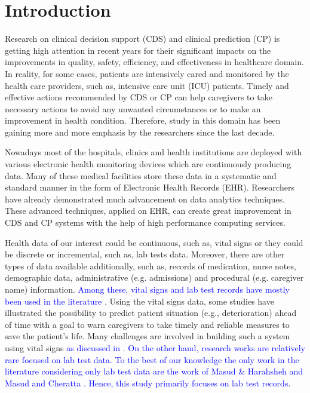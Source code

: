 \section{Introduction}
Research on clinical decision support (CDS) and clinical prediction (CP) is getting high attention in recent years for their significant impacts on the improvements in quality, safety, efficiency, and effectiveness in healthcare domain. In reality, for some cases, patients are intensively cared and monitored by the health care providers, such as, intensive care unit (ICU) patients. Timely and effective actions recommended by CDS or CP can help caregivers to take necessary actions to avoid any unwanted circumstances or to make an improvement in health condition. Therefore, study in this domain has been gaining more and more emphasis by the researchers since the last decade. 

Nowadays most of the hospitals, clinics and health institutions are deployed with various electronic health monitoring devices which are continuously producing data. Many of these medical facilities store these data in  a systematic and standard manner in the form of Electronic Health Records (EHR). Researchers have already demonstrated much advancement on data analytics techniques. These advanced techniques, applied on EHR, can create great improvement in CDS and CP systems with the help of high performance computing services.

Health data of our interest could be continuous, such as, vital signs or they could be discrete or incremental, such as, lab tests data. Moreover, there are other types of data available additionally, such as, records of medication, nurse notes, demographic data, administrative (e.g. admissions) and procedural (e.g. caregiver name) information. \textcolor{blue}{Among these, vital signs and lab test records have mostly been used in the literature \cite{Mao,Fialho,Baumgartner,Cheng, Ghassemi2015, Jin2018, Yoon2016, Johnson2017, Calvert2016, Suresh2017, Bhattacharya2017, Xie2017, Awad2017, Nguyen2017, Zhang2017, Johnson2nd2017, Davoodi2018, Sadeghi2018, Zheng2018, Johnson3rd2018, Zahid2018, Purushotham2018, Meyer2018, Hsieh2018, Ho2019, Gennatas2019, Torres2019}}. Using the vital signs data, some studies have illustrated the possibility to predict patient situation (e.g., deterioration) ahead of time with a goal to warn caregivers to take timely and reliable measures to save the patient’s life. Many challenges are involved in building such a system using vital signs \textcolor{blue}{as discussed in \cite{Mao,Fialho,Baumgartner,Cheng, ZhengpingChe2016, Zahid2018, Zheng2018, Xiao2018}. On the other hand, research works are relatively rare focused on lab test data. To the best of our knowledge the only work in the literature considering only lab test data are the work of  Masud \& Harahsheh \cite{mehedy-masud:2017:fvc} and Masud and Cheratta \cite{mehedy-masud:2018:frmwrk}. Hence, this study primarily focuses on lab test records}.

